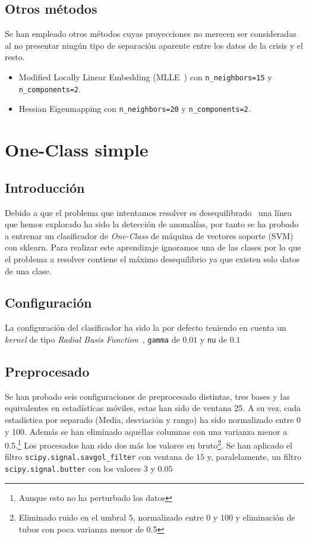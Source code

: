 \documentclass[a4paper,12pt,twoside,oldfontcommands]{memoir}
\begin{document}
\section{Otros métodos}
Se han empleado otros métodos cuyas proyecciones no merecen ser consideradas al no presentar ningún tipo de separación aparente entre los datos de la crisis y el resto. 
\begin{itemize}
    \item Modified Locally Linear Embedding (MLLE~\cite{zhang2007mlle}) con \texttt{n\_neighbors=15} y \texttt{n\_components=2}.
    \item Hessian Eigenmapping con \texttt{n\_neighbors=20} y \texttt{n\_components=2}. 
\end{itemize}
\chapter{One-Class simple}
\section{Introducción}
Debido a que el problema que intentamos resolver es desequilibrado~\cite{galar2012review} una línea que hemos explorado ha sido la detección de anomalías, por tanto se ha probado a entrenar un clasificador de \textit{One-Class} de máquina de vectores soporte (SVM) con sklearn. Para realizar este aprendizaje ignoramos una de las clases por lo que el problema a resolver contiene el máximo desequilibrio ya que existen solo datos de una clase.
\section{Configuración}
La configuración del clasificador ha sido la por defecto teniendo en cuenta un \textit{kernel} de tipo \textit{Radial Basis Function}~\cite{wiki:rbf}, \texttt{gamma} de \(0.01\) y \texttt{nu} de \(0.1\) 
\section{Preprocesado}
Se han probado seis configuraciones de preprocesado distintas, tres bases y las equivalentes en estadísticas móviles, estas han sido de ventana 25. A su vez, cada estadística por separado (Media, desviación y rango) ha sido normalizado entre 0 y 100. Además se han eliminado aquellas columnas con una varianza menor a 0.5.\footnote{Aunque esto no ha perturbado los datos}
Los procesados han sido dos más los valores en bruto\footnote{Eliminado ruido en el umbral \(5\), normalizado entre 0 y 100 y eliminación de tubos con poca varianza menor de 0.5}. Se han aplicado el filtro \texttt{scipy.signal.savgol\_filter} con ventana de \(15\) y, paralelamente, un filtro \texttt{scipy.signal.butter} con los valores \(3\) y \(0.05\)
\end{document}
